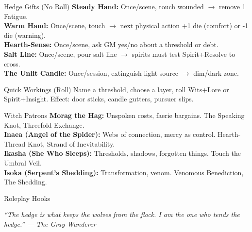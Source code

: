 \documentclass[10pt]{article}
\begin{document}
\begin{minipage}[t]{0.48\linewidth}
    \begin{charbox}{Hedge Gifts (No Roll)}
        \textbf{Steady Hand:} Once/scene, touch wounded $\rightarrow$ remove 1 Fatigue.\\
        \textbf{Warm Hand:} Once/scene, touch $\rightarrow$ next physical action +1 die (comfort) or -1 die (warning).\\
        \textbf{Hearth-Sense:} Once/scene, ask GM yes/no about a threshold or debt.\\
        \textbf{Salt Line:} Once/scene, pour salt line $\rightarrow$ spirits must test Spirit+Resolve to cross.\\
        \textbf{The Unlit Candle:} Once/session, extinguish light source $\rightarrow$ dim/dark zone.
    \end{charbox}
    
    \vspace{0.5em}
    
    \begin{charbox}{Quick Workings (Roll)}
        Name a threshold, choose a layer, roll Wits+Lore or Spirit+Insight. Effect: door sticks, candle gutters, pursuer slips.
    \end{charbox}
    
    \vspace{0.5em}
    
    \begin{charbox}{Witch Patrons}
        \textbf{Morag the Hag:} Unspoken costs, faerie bargains. The Speaking Knot, Threefold Exchange.\\
        \textbf{Inaea (Angel of the Spider):} Webs of connection, mercy as control. Hearth-Thread Knot, Strand of Inevitability.\\
        \textbf{Ikasha (She Who Sleeps):} Thresholds, shadows, forgotten things. Touch the Umbral Veil.\\
        \textbf{Isoka (Serpent's Shedding):} Transformation, venom. Venomous Benediction, The Shedding.
    \end{charbox}
    
    \vspace{0.5em}
    
    \begin{charbox}{Roleplay Hooks}
        \underline{\hspace{7cm}}\\
        \underline{\hspace{7cm}}
    \end{charbox}
\end{minipage}

\vspace{1em}
\begin{center}
    {\small\sffamily\itshape ``The hedge is what keeps the wolves from the flock. I am the one who tends the hedge.'' --- The Gray Wanderer}
\end{center}
\end{document}
